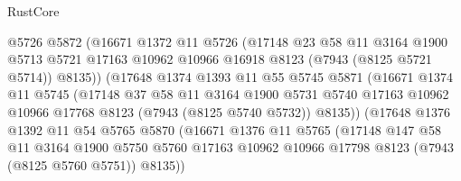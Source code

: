 \begin{lexlean}{RustCore}
\begin{coremodule}
                        @5726
                        @5872
                        (@16671
                          @1372
                          @11
                          @5726
                          (@17148
                            @23
                            @58
                            @11
                            @3164
                            @1900
                            @5713
                            @5721
                            @17163
                            @10962
                            @10966
                            @16918
                            @8123
                            (@7943 (@8125 @5721 @5714))
                            @8135))
                        (@17648
                          @1374
                          @1393
                          @11
                          @55
                          @5745
                          @5871
                          (@16671
                            @1374
                            @11
                            @5745
                            (@17148
                              @37
                              @58
                              @11
                              @3164
                              @1900
                              @5731
                              @5740
                              @17163
                              @10962
                              @10966
                              @17768
                              @8123
                              (@7943 (@8125 @5740 @5732))
                              @8135))
                          (@17648
                            @1376
                            @1392
                            @11
                            @54
                            @5765
                            @5870
                            (@16671
                              @1376
                              @11
                              @5765
                              (@17148
                                @147
                                @58
                                @11
                                @3164
                                @1900
                                @5750
                                @5760
                                @17163
                                @10962
                                @10966
                                @17798
                                @8123
                                (@7943 (@8125 @5760 @5751))
                                @8135))

\end{coremodule}
\end{lexlean}
